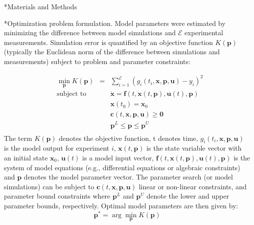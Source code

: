 \documentclass[12pt]{article}
\makeatletter
\renewcommand\subsection{\@startsection
	{subsection}{2}{0mm}
	{-0.05in}
	{-0.5\baselineskip}
	{\normalfont\normalsize\bfseries}}
\renewcommand\section{\@startsection
	{subsection}{2}{0mm}
	{-0.2in}
	{0.05\baselineskip}
	{\normalfont\large\bfseries}}
\makeatother
\begin{document}
\clearpage

\section*{Materials and Methods}

\subsection*{Optimization problem formulation.}
Model parameters were estimated by minimizing the difference between model simulations and $\mathcal{E}$ experimental measurements.
Simulation error is quantified by an objective function $K\left(\mathbf{p}\right)$
(typically the Euclidean norm of the difference between simulations and measurements) subject to problem and parameter constraints:

\begin{equation}\label{eq:static_opt}
\begin{aligned}
& \min_{\mathbf{p}} K(\mathbf{p}) & =& \sum_{i=1}^\mathcal{E} \left(g_i(t_i,\mathbf{x,p,u})-y_i\right)^2 \\
& \text{subject to}
&&\dot{\mathbf{x}}=\mathbf{f}(t,\mathbf{x}(t,\mathbf{p}),\mathbf{u}(t),\mathbf{p})\\
&&&\mathbf{x}(t_0) = \mathbf{x}_0\\
&&&\mathbf{c}(t,\mathbf{x,p,u}) \geqslant \mathbf{0} \\
&&& \mathbf{p}^L \leqslant \mathbf{p} \leqslant \mathbf{p}^U\\
\end{aligned}
\end{equation}
The term $K(\mathbf{p})$ denotes the objective function, t denotes time, $g_i(t_i,\mathbf{x,p,u})$ is the model output for experiment $i$,
$\mathbf{x}\left(t,\mathbf{p}\right)$ is the state variable vector with an initial state $\mathbf{x}_{0}$, $\mathbf{u}(t)$ is a model input vector,
$\mathbf{f}(t,\mathbf{x}(t,\mathbf{p}),\mathbf{u}(t),\mathbf{p})$ is the system of model equations (e.g., differential equations or algebraic constraints)
and $\mathbf{p}$ denotes the model parameter vector.
The parameter search (or model simulations) can be subject to $\mathbf{c}(t,\mathbf{x,p,u})$ linear or non-linear constraints, and parameter bound constraints where
$\mathbf{p}^{L}$ and $\mathbf{p}^{U}$ denote the lower and upper parameter bounds, respectively.
Optimal model parameters are then given by:
\begin{equation}\label{eq:static_opt_2}
\mathbf{p^{*}}= \arg\min_{\mathbf{p}} K\left(\mathbf{\mathbf{p}}\right)
\end{equation}
\end{document}
